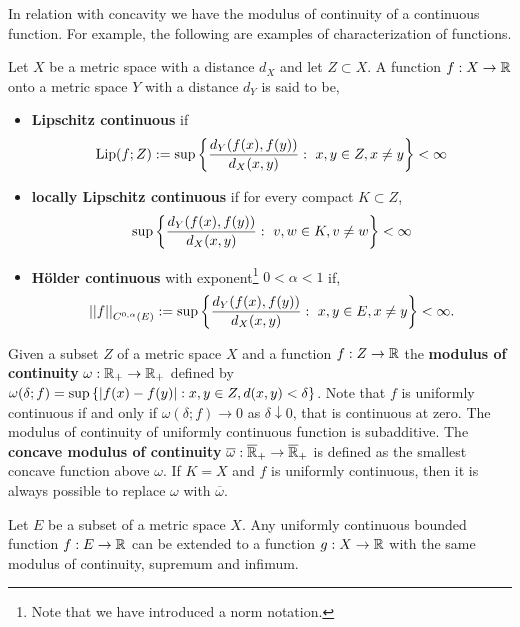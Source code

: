 In relation with concavity we have the modulus of continuity of a continuous function. For example, the following are examples of characterization of functions.
\begin{definition}
	Let $X$ be a metric space with a distance $d_X$ and let $Z \subset X$. A function $f: X\rightarrow \mathbb{R}$ onto a metric space $Y$ with a distance $d_Y$ is said to be,
	\begin{itemize}
		\item \textbf{Lipschitz continuous} if
		\begin{equation*}
		\mathrm{Lip}(f; Z):=\sup\left\lbrace \frac{d_Y(f(x), f(y))}{d_X(x,y)}: \ x,y \in Z, x\neq y \right\rbrace < \infty
		\end{equation*}
		\item \textbf{locally Lipschitz continuous} if for every compact $K\subset Z$,
		\begin{equation*}
		\sup\left\lbrace \frac{d_Y(f(x), f(y))}{d_X(x,y)}: \ v,w \in K, v\neq w \right\rbrace<\infty
		\end{equation*}
		\item  \textbf{H\"older continuous} with exponent\footnote{Note that we have introduced a norm notation.} $0<\alpha<1$ if,
		\begin{equation*}
			\left|\left|f\right|\right|_{C^{0,\alpha}(E)}:=\sup\left\lbrace \frac{d_Y(f(x),f(y))}{d_X(x,y)}: \ x, y \in E, x\neq y \right\rbrace<\infty.
		\end{equation*}
	\end{itemize}
\end{definition}
Given a subset $Z$ of a metric space $X$ and a function $f: Z\rightarrow \mathbb{R}$ the \textbf{modulus of continuity} $\omega:\mathbb{R}_+\rightarrow \mathbb{R}_+$ defined by $\omega(\delta;f)=\sup\left\lbrace \left| f(x)-f(y) \right|: x,y \in Z, d(x,y)<\delta \right\rbrace$. Note that $f$ is uniformly continuous if and only if $\omega(\delta; f)\rightarrow 0$ as $\delta\downarrow 0$, that is continuous at zero. The modulus of continuity of uniformly continuous function is subadditive. The \textbf{concave modulus of continuity} $\overline{\omega}:\overline{\mathbb{R}}_+\rightarrow \overline{\mathbb{R}}_+$ is defined as the smallest concave function above $\omega$. If $K=X$ and $f$ is uniformly continuous, then it is always possible to replace $\omega$ with $\overline{\omega}$.
\begin{theorem}
	Let $E$ be a subset of a metric space $X$. Any uniformly continuous bounded function $f:E\rightarrow\mathbb{R}$ can be extended to a function $g:X\rightarrow \mathbb{R}$ with the same modulus of continuity, supremum and infimum.
\end{theorem}



